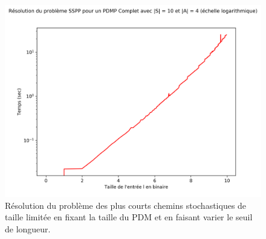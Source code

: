\documentclass[12pt,a4paper]{report}
\theoremstyle{definition}%
\theoremstyle{remark}
\begin{document}
\begin{figure}[h]
	\includegraphics[scale=0.4]{figures/sspp_pseudopoly4.png}
	\caption{\footnotesize Résolution du problème des plus courts chemins stochastiques de taille limitée en fixant la taille du PDM et en faisant varier le seuil de longueur.}
		\label{pseudopoly}
\end{figure}
\end{document}
